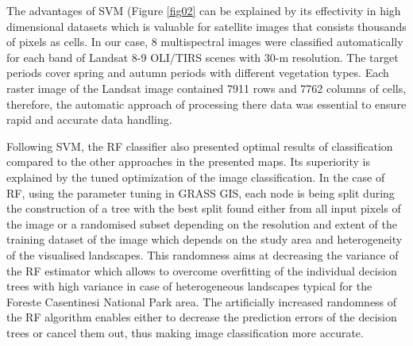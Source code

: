 \documentclass[eprint,
approc,		%
]{actapoly}
\begin{document}
The advantages of SVM (Figure \ref{fig02} can be explained by its effectivity in high dimensional datasets which is valuable for satellite images that consists thousands of pixels as cells. In our case, 8 multispectral images were classified automatically for each band of Landsat 8-9 OLI/TIRS scenes with 30-m resolution. The target periods cover spring and autumn periods with different vegetation types. Each raster image of the Landsat image contained 7911 rows and 7762 columns of cells, therefore, the automatic approach of processing there data was essential to ensure rapid and accurate data handling. 

Following SVM, the RF classifier also presented optimal results of classification compared to the other approaches in the presented maps. Its superiority is explained by the tuned optimization of the image classification. In the case of RF, using the parameter tuning in GRASS GIS, each node is being split during the construction of a tree with the best split found either from all input pixels of the image or a randomised subset depending on the resolution and extent of the training dataset of the image which depends on the study area and heterogeneity of the visualised landscapes. This randomness aims at decreasing the variance of the RF estimator which allows to overcome overfitting of the individual decision trees with high variance in case of heterogeneous landscapes typical for the Foreste Casentinesi National Park area. The artificially increased randomness of the RF algorithm enables either to decrease the prediction errors of the decision trees or cancel them out, thus making image classification more accurate. 
\end{document}
